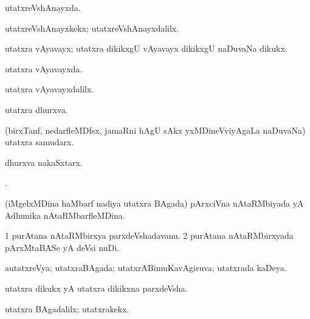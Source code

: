 \bentry
{}
\gl{\gu}
\bmng
utatxreVshAnayxda. 
\emng
\eentry

\bentry
{}
\gl{\kirxvi}
\bmng
utatxreVshAnayxkekx; utatxreVshAnayxdalilx. 
\emng
\eentry

\bentry
{}
\gl{\nA}
\bmng
utatxra vAyavayx; utatxra dikikxgU vAyavayx dikikxgU naDuvaNa dikukx. 
\emng
\eentry

\bentry
{}
\gl{\gu}
\bmng
utatxra vAyavayxda. 
\emng
\eentry

\bentry
{}
\gl{\kirxvi}
\bmng
utatxra vAyavayxdalilx. 
\emng
\eentry

\bentry
{}
\gl{\nA}
\bmng
utatxra dhurxva. 
\emng
\eentry

\bentry
{}
\gl{\nA}
\bmng
(birxTanf, nedarfleMDfsx, jamaRni hAgU sAkx yxMDineVviyAgaLa naDuvaNa) utatxra samudarx. 
\emng
\eentry

\bentry
{}
\gl{\nA}
\bmng
dhurxva nakaSxtarx. 
\emng
\eentry

\bentry
{}
\gl{\saMkiSx}
\bmng
{}. 
\emng
\eentry

\bentry
{}
\gl{\gu}
\bmng
(iMgelxMDina haMbarf nadiya utatxra BAgada) pArxciVna nAtaRMbiyada yA Adhunika nAtaRMbarfleMDina. 
\emng
\eentry

\bentry
{}
\gl{\nA}
\bmng
\bnum
\num{1} purAtana nAtaRMbirxya parxdeVshadavanu. 
\num{2} purAtana nAtaRMbirxyada pArxMtaBASe yA deVsi nuDi. 
\enum
\emng
\eentry

\bentry
{}
\gl{\gu}
\bmng
autatxreVya; utatxraBAgada; utatxrABimuKavAgiruva; utatxrada kaDeya. 
\emng
\eentry

\bentry
{}
\gl{\nA}
\bmng
utatxra dikukx yA utatxra dikikxna parxdeVsha. 
\emng
\eentry

\bentry
{}
\gl{\kirxvi}
\bmng
utatxra BAgadalilx; utatxrakekx. 
\emng
\eentry

